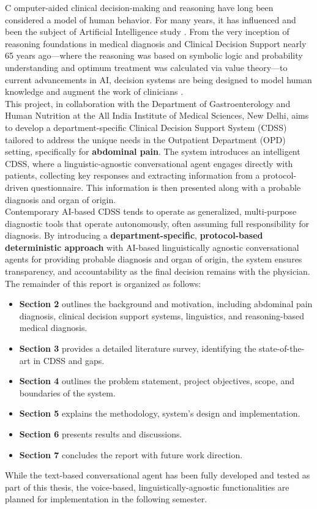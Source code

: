 \lettrine{C}{ }omputer-aided clinical decision-making and reasoning have long been considered a model of human behavior. For many years, it has influenced and been the subject of Artificial Intelligence study \cite{cohen2022introducing}. From the very inception of reasoning foundations in medical diagnosis and Clinical Decision Support nearly 65 years ago---where the reasoning was based on symbolic logic and probability understanding and optimum treatment was calculated via value theory---to current advancements in AI, decision systems are being designed to model human knowledge and augment the work of clinicians \cite{ledley1959reasoning, rajkomar2019machine}.\\

\noindent This project, in collaboration with the Department of Gastroenterology and Human Nutrition at the All India Institute of Medical Sciences, New Delhi, aims to develop a department-specific Clinical Decision Support System (CDSS) tailored to address the unique needs in the Outpatient Department (OPD) setting, specifically for \textcolor{TUMRed}{\textbf{abdominal pain}}. The system introduces an intelligent CDSS, where a linguistic-agnostic conversational agent engages directly with patients, collecting key responses and extracting information from a protocol-driven questionnaire. This information is then presented along with a probable diagnosis and organ of origin.\\

\noindent Contemporary AI-based CDSS tends to operate as generalized, multi-purpose diagnostic tools that operate autonomously, often assuming full responsibility for diagnosis. By introducing a \textcolor{TUMRed}{\textbf{department-specific}}, \textcolor{TUMRed}{\textbf{protocol-based deterministic approach}} with AI-based linguistically agnostic conversational agents for providing probable diagnosis and organ of origin, the system ensures transparency, and accountability as the final decision remains with the physician.\\

\noindent The remainder of this report is organized as follows:
\begin{itemize}
    \item \textcolor{TUMRed}{\textbf{Section 2}} outlines the background and motivation, including abdominal pain diagnosis, clinical decision support systems, linguistics, and reasoning-based medical diagnosis.
    \item \textcolor{TUMRed}{\textbf{Section 3}} provides a detailed literature survey, identifying the state-of-the-art in CDSS and gaps.
    \item \textcolor{TUMRed}{\textbf{Section 4}} outlines the problem statement, project objectives, scope, and boundaries of the system.
    \item \textcolor{TUMRed}{\textbf{Section 5}} explains the methodology, system's design and implementation.
    \item \textcolor{TUMRed}{\textbf{Section 6}} presents results and discussions.
    \item \textcolor{TUMRed}{\textbf{Section 7}} concludes the report with future work direction.
\end{itemize}

\noindent While the text-based conversational agent has been fully developed and tested as part of this thesis, the voice-based, linguistically-agnostic functionalities are planned for implementation in the following semester.